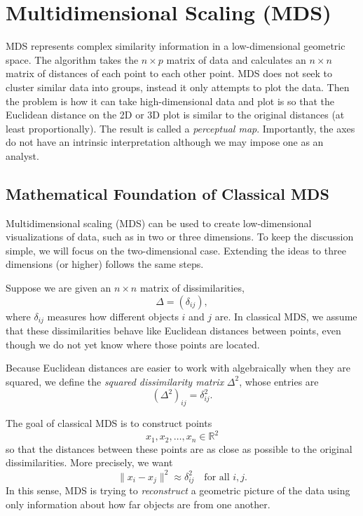 \section{Multidimensional Scaling (MDS)}

\medskip

MDS represents complex similarity information in a low-dimensional geometric space. The algorithm takes the $n\times p$ matrix of data and calculates an $n\times n$ matrix of distances of each point to each other point. MDS does not seek to cluster similar data into groups, instead it only attempts to plot the data. Then the problem is how it can take high-dimensional data and plot is so that the Euclidean distance on the 2D or 3D plot is similar to the original distances (at least proportionally). The result is called a \textit{perceptual map}. Importantly, the axes do not have an intrinsic interpretation although we may impose one as an analyst.

\bigskip

\subsection{Mathematical Foundation of Classical MDS}

\medskip

Multidimensional scaling (MDS) can be used to create low-dimensional visualizations
of data, such as in two or three dimensions. To keep the discussion simple, we
will focus on the two-dimensional case. Extending the ideas to three dimensions
(or higher) follows the same steps.

\medskip

Suppose we are given an $n \times n$ matrix of dissimilarities,
\[
\Delta = (\delta_{ij}),
\]
where $\delta_{ij}$ measures how different objects $i$ and $j$ are. In classical
MDS, we assume that these dissimilarities behave like Euclidean distances between
points, even though we do not yet know where those points are located.

Because Euclidean distances are easier to work with algebraically when they are
squared, we define the \emph{squared dissimilarity matrix} $\Delta^2$, whose entries
are
\[
(\Delta^2)_{ij} = \delta_{ij}^2.
\]

The goal of classical MDS is to construct points
\[
x_1, x_2, \dots, x_n \in \mathbb{R}^2
\]
so that the distances between these points are as close as possible to the
original dissimilarities. More precisely, we want
\[
\|x_i - x_j\|^2 \approx \delta_{ij}^2
\quad \text{for all } i,j.
\]
In this sense, MDS is trying to \emph{reconstruct} a geometric picture of the data
using only information about how far objects are from one another.

